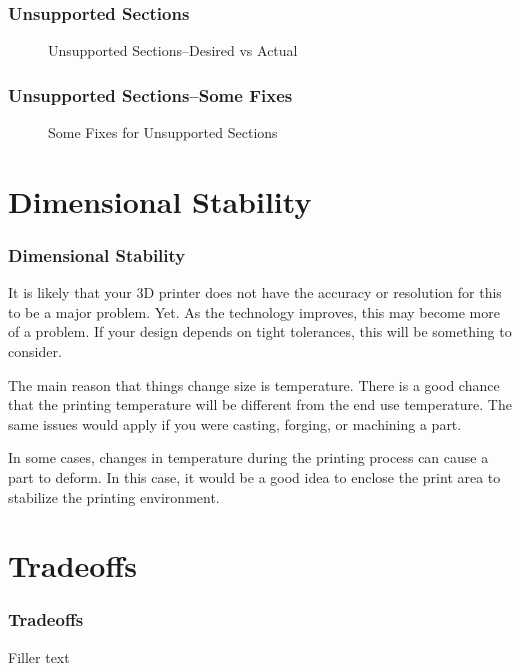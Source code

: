 \documentclass[english,10pt]{beamer}
\begin{document}
\begin{frame}
  \frametitle{Unsupported Sections}
  \begin{figure}
    
    \caption{Unsupported Sections--Desired vs Actual}
  \end{figure}
\end{frame}

\begin{frame}
  \frametitle{Unsupported Sections--Some Fixes}
  \begin{figure}
    
    \caption{Some Fixes for Unsupported Sections}
  \end{figure}
\end{frame}

\section{Dimensional Stability}
\begin{frame}
  \frametitle{Dimensional Stability}
  It is likely that your 3D printer does not have the accuracy or resolution for this to be a major problem.  Yet.  As the technology improves, this may become more of a problem.  If your design depends on tight tolerances, this will be something to consider.
  
  The main reason that things change size is temperature.  There is a good chance that the printing temperature will be different from the end use temperature.  The same issues would apply if you were casting, forging, or machining a part.
  
  In some cases, changes in temperature during the printing process can cause a part to deform.  In this case, it would be a good idea to enclose the print area to stabilize the printing environment.
\end{frame}

\section{Tradeoffs}
\begin{frame}
  \frametitle{Tradeoffs}
  Filler text
\end{frame}
\end{document}

